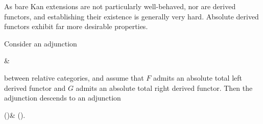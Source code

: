 As bare Kan extensions are not particularly well-behaved, nor are derived functors, and establishing their existence is generally very hard. Absolute derived functors exhibit far more desirable properties.
\begin{proposition}
	Consider an adjunction
	\begin{diagram*}[cramped]
		\calC\ar[r,bend left,"F",""{name=A,below}] & \calD \ar[l,bend left,"G",""{name=B,above}]\ar[from=A,to=B,symbol=\dashv]
	\end{diagram*}
	between relative categories, and assume that \(F\) admits an absolute total left derived functor and \(G\) admits an absolute total right derived functor. Then the adjunction
	descends to an adjunction
	\begin{diagram*}[cramped,column sep=large]
		\ho(\calC)\ar[r,bend left,"\bfL F",""{name=A,below}] & \ho(\calD). \ar[l,bend left,"\bfR G",""{name=B,above}]\ar[from=A,to=B,symbol=\dashv]
	\end{diagram*}
\end{proposition}
